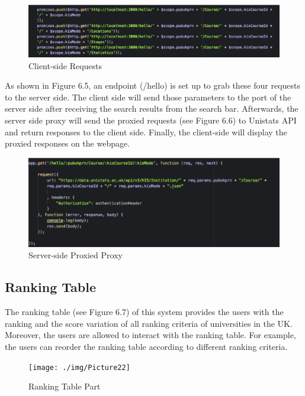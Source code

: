 \begin{figure}[H]
  \centering
  \includegraphics[width=15cm]{./img/Picture20}
  \caption{Client-side Requests}
  \label{Figure:figex}
\end{figure}


As shown in Figure 6.5, an endpoint (/hello) is set up to grab these four requests to the server side. The client side will send those parameters to the port of the server side after receiving the search results from the search bar. Afterwards, the server side proxy will send the proxied requests (see Figure 6.6) to Unistats API and return responses to the client side. Finally, the client-side will display the proxied responses on the webpage. 

\begin{figure}[H]
  \centering
  \includegraphics[width=15cm]{./img/Picture21}
  \caption{Server-side Proxied Proxy
}
  \label{Figure:figex}
\end{figure}



\subsection{Ranking Table}

The ranking table (see Figure 6.7) of this system provides the users with the ranking and the score variation of all ranking criteria of universities in the UK. Moreover, the users are allowed to interact with the ranking table. For example, the users can reorder the ranking table according to different ranking criteria. 

\begin{figure}[H]
  \centering
  \texttt{[image: ./img/Picture22]}
  \caption{Ranking Table Part}
  \label{Figure:figex}
\end{figure}


